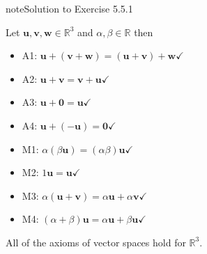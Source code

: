 \documentclass[letterpaper,10pt,english]{jupyterBook}
\begin{document}
\begin{sphinxadmonition}{note}{Solution to Exercise 5.5.1}



\sphinxAtStartPar
Let \(\mathbf{u}, \mathbf{v}, \mathbf{w} \in \mathbb{R}^3\) and \(\alpha, \beta \in \mathbb{R}\) then
\begin{itemize}
\item {} 
\sphinxAtStartPar
A1: \(\mathbf{u} + (\mathbf{v} + \mathbf{w}) = (\mathbf{u} + \mathbf{v}) + \mathbf{w} \checkmark\)

\item {} 
\sphinxAtStartPar
A2: \(\mathbf{u} + \mathbf{v} = \mathbf{v} + \mathbf{u} \checkmark\)

\item {} 
\sphinxAtStartPar
A3: \(\mathbf{u} + \mathbf{0} = \mathbf{u} \checkmark\)

\item {} 
\sphinxAtStartPar
A4: \(\mathbf{u} + (-\mathbf{u}) = \mathbf{0} \checkmark\)

\item {} 
\sphinxAtStartPar
M1: \(\alpha(\beta \mathbf{u}) = (\alpha \beta) \mathbf{u} \checkmark\)

\item {} 
\sphinxAtStartPar
M2: \(1 \mathbf{u} = \mathbf{u} \checkmark\)

\item {} 
\sphinxAtStartPar
M3: \(\alpha(\mathbf{u} + \mathbf{v}) = \alpha\mathbf{u} + \alpha \mathbf{v} \checkmark\)

\item {} 
\sphinxAtStartPar
M4: \((\alpha + \beta) \mathbf{u} = \alpha \mathbf{u} + \beta \mathbf{u} \checkmark\)

\end{itemize}

\sphinxAtStartPar
All of the axioms of vector spaces hold for \(\mathbb{R}^3\).
\end{sphinxadmonition}
 \label{_pages/A5_Vector_spaces_exercises_solutions:_pages/A5_Vector_spaces_exercises_solutions-solution-1}
\end{document}
